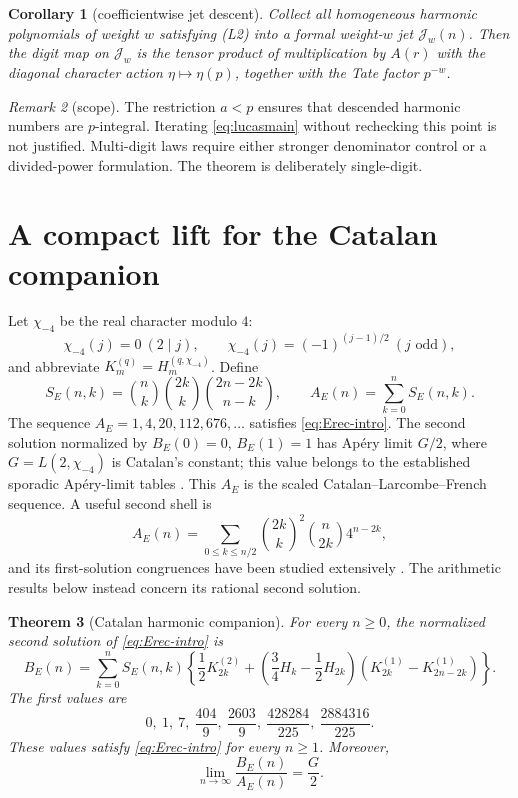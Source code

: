 \documentclass[11pt]{article}
\newtheorem{theorem}{Theorem}[section]
\newtheorem{corollary}[theorem]{Corollary}
\theoremstyle{definition}
\theoremstyle{remark}
\newtheorem{remark}[theorem]{Remark}
\begin{document}
\begin{corollary}[coefficientwise jet descent]\label{cor:jet}
Collect all homogeneous harmonic polynomials of weight $w$ satisfying (L2) into a formal
weight-$w$ jet $\mathcal J_w(n)$.  Then the digit map on $\mathcal J_w$ is the tensor
product of multiplication by $A(r)$ with the diagonal character action
$\eta\mapsto\eta(p)$, together with the Tate factor $p^{-w}$.
\end{corollary}

\begin{remark}[scope]
The restriction $a<p$ ensures that descended harmonic numbers are $p$-integral.  Iterating
\eqref{eq:lucasmain} without rechecking this point is not justified.  Multi-digit laws
require either stronger denominator control or a divided-power formulation.  The theorem
is deliberately single-digit.
\end{remark}

\section{A compact lift for the Catalan companion}

Let $\chi_{-4}$ be the real character modulo $4$:
\[
 \chi_{-4}(j)=0\ (2\mid j),\qquad
 \chi_{-4}(j)=(-1)^{(j-1)/2}\ (j\text{ odd}),
\]
and abbreviate $K_m^{(q)}=H_m^{(q,\chi_{-4})}$.  Define
\begin{equation}\label{eq:Eshell}
 S_E(n,k)=\binom nk\binom{2k}k\binom{2n-2k}{n-k},\qquad
 A_E(n)=\sum_{k=0}^nS_E(n,k).
\end{equation}
The sequence $A_E=1,4,20,112,676,\ldots$ satisfies \eqref{eq:Erec-intro}.  The second
solution normalized by $B_E(0)=0$, $B_E(1)=1$ has Ap\'ery limit $G/2$, where
$G=L(2,\chi_{-4})$ is Catalan's constant; this value belongs to the established sporadic
Ap\'ery-limit tables \cite{Zagier,ChamStraub,MalikStraub}.
This $A_E$ is the scaled Catalan--Larcombe--French sequence.  A useful second shell is
\begin{equation}\label{eq:parityshell}
 A_E(n)=\sum_{0\le k\le n/2}
 \binom{2k}{k}^{\!2}\binom n{2k}4^{n-2k},
\end{equation}
and its first-solution congruences have been studied extensively
\cite{JiSunCLF,StraubGessel}.  The arithmetic results below instead concern its rational
second solution.

\begin{theorem}[Catalan harmonic companion]\label{thm:Catalan}
For every $n\ge0$, the normalized second solution of \eqref{eq:Erec-intro} is
\begin{equation}\label{eq:CatalanB}
 B_E(n)=\sum_{k=0}^nS_E(n,k)\left\{
 \frac12K_{2k}^{(2)}+
 \left(\frac34H_k-\frac12H_{2k}\right)
 \left(K_{2k}^{(1)}-K_{2n-2k}^{(1)}\right)\right\}.
\end{equation}
The first values are
\[
 0,\ 1,\ 7,\ \frac{404}{9},\ \frac{2603}{9},\
 \frac{428284}{225},\ \frac{2884316}{225}.
\]
These values satisfy \eqref{eq:Erec-intro} for every $n\ge1$.  Moreover,
\begin{equation}\label{eq:Catalanlimit}
 \lim_{n\to\infty}\frac{B_E(n)}{A_E(n)}=\frac G2.
\end{equation}
\end{theorem}
\end{document}
